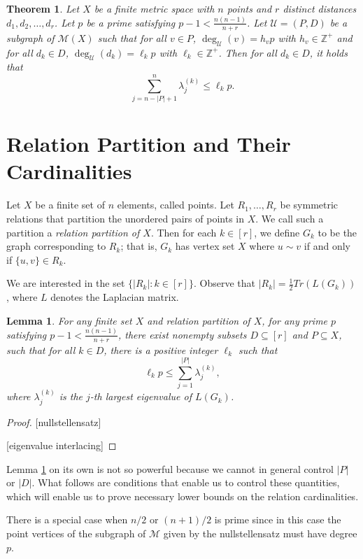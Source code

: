 \documentclass[12pt]{article}
\newcommand{\Z}{\mathbb{Z}}
\newtheorem{thm}{Theorem}[section] %
\newtheorem{lem}{Lemma} %
\theoremstyle{definition}
\begin{document}
	\begin{thm}
		Let $X$ be a finite metric space with $n$ points and $r$ distinct distances $d_1, d_2, \ldots, d_r$.  Let $p$ be a prime satisfying $p-1 < \tfrac{n(n-1)}{n+r}$.  Let $\mathcal{U} = (P,D)$ be a subgraph of $\mathcal{M}(X)$ such that for all $v \in P$, $\deg_{\mathcal{U}}(v) = h_vp$ with $h_v \in \Z^+$ and for all $d_k \in D$, $\deg_{\mathcal{U}}(d_k) = \ell_k p $ with $\ell_k \in \Z^+$.  Then for all $d_k \in D$, it holds that
		$$\sum_{j=n-|P|+1}^n \lambda_j^{(k)} \leq \ell_k p.$$
	\end{thm}
	\newpage
	\section{Relation Partition and Their Cardinalities}
	Let $X$ be a finite set of $n$ elements, called points.  Let $R_1, \ldots, R_r$ be symmetric relations that partition the unordered pairs of points in $X$.  We call such a partition a \emph{relation partition of $X$}.  Then for each $k \in [r]$, we define $G_k$ to be the graph corresponding to $R_k$; that is, $G_k$ has vertex set $X$ where $u\sim v$ if and only if $\{u,v\} \in R_k$.  
	
	We are interested in the set $\{|R_k|: k \in [r]\}$.  Observe that $|R_k| = \tfrac{1}{2}Tr(L(G_k))$, where $L$ denotes the Laplacian matrix.
	\begin{lem}\label{Lem-NullstellensatzEigenvalueInterlacing}
		For any finite set $X$ and relation partition of $X$, for any prime $p$ satisfying $p-1 < \tfrac{n(n-1)}{n+r}$, there exist nonempty subsets $D \subseteq [r]$ and $P \subseteq X$, such that for all $k \in D$, there is a positive integer $\ell_k$ such that
		$$\ell_k p \leq \sum_{j =1}^{|P|}\lambda_j^{(k)},$$
		where $\lambda_j^{(k)}$ is the $j$-th largest eigenvalue of $L(G_k)$.
	\end{lem}
	\begin{proof}
		
		[nullstellensatz]
		
		[eigenvalue interlacing]
	\end{proof}
	
	Lemma \ref{Lem-NullstellensatzEigenvalueInterlacing} on its own is not so powerful because we cannot in general control $|P|$ or $|D|$.  What follows are conditions that enable us to control these quantities, which will enable us to prove necessary lower bounds on the relation cardinalities.
	
	There is a special case when $n/2$ or $(n+1)/2$ is prime since in this case the point vertices of the subgraph of $\mathcal{M}$ given by the nullstellensatz must have degree $p$.
	
\end{document}
